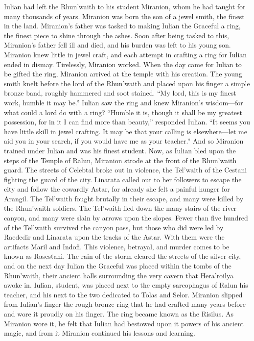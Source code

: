 \documentclass[smalldemyvopaper,11pt,twoside,onecolumn,openright,extrafontsizes]{memoir}
\begin{document}
Iulian had left the Rhun’waith to his student Miranion, whom he had taught for many thousands of years. Miranion was born the son of a jewel smith, the finest in the land. Miranion’s father was tasked to making Iulian the Graceful a ring, the finest piece to shine through the ashes. Soon after being tasked to this, Miranion’s father fell ill and died, and his burden was left to his young son. Miranion knew little in jewel craft, and each attempt in crafting a ring for Iulian ended in dismay. Tirelessly, Miranion worked. When the day came for Iulian to be gifted the ring, Miranion arrived at the temple with his creation. The young smith knelt before the lord of the Rhun’waith and placed upon his finger a simple bronze band, roughly hammered and soot stained. “My lord, this is my finest work, humble it may be.” Iulian saw the ring and knew Miranion’s wisdom—for what could a lord do with a ring?
“Humble it is, though it shall be my greatest possession, for in it I can find more than beauty,” responded Iulian. “It seems you have little skill in jewel crafting. It may be that your calling is elsewhere—let me aid you in your search, if you would have me as your teacher.” And so Miranion trained under Iulian and was his finest student. Now, as Iulian bled upon the steps of the Temple of Ralun, Miranion strode at the front of the Rhun’waith guard. The streets of Celebtal broke out in violence, the Tel’waith of the Cestani fighting the guard of the city. Linarata called out to her followers to escape the city and follow the cowardly Astar, for already she felt a painful hunger for Arangil. The Tel’waith fought brutally in their escape, and many were killed by the Rhun’waith soldiers. The Tel’waith fled down the many stairs of the river canyon, and many were slain by arrows upon the slopes. Fewer than five hundred of the Tel’waith survived the canyon pass, but those who did were led by Raededir and Linarata upon the tracks of the Astar. With them were the artifacts Maril and Indofi. This violence, betrayal, and murder comes to be known as Rasestani.
The rain of the storm cleared the streets of the silver city, and on the next day Iulian the Graceful was placed within the tombs of the Rhun’waith, their ancient halls surrounding the very cavern that Hera’roilya awoke in. Iulian, student, was placed next to the empty sarcophagus of Ralun his teacher, and his next to the two dedicated to Tolas and Selor. Miranion slipped from Iulian’s finger the rough bronze ring that he had crafted many years before and wore it proudly on his finger. The ring became known as the Risilus. As Miranion wore it, he felt that Iulian had bestowed upon it powers of his ancient magic, and from it Miranion continued his lessons and learning.
\end{document}
